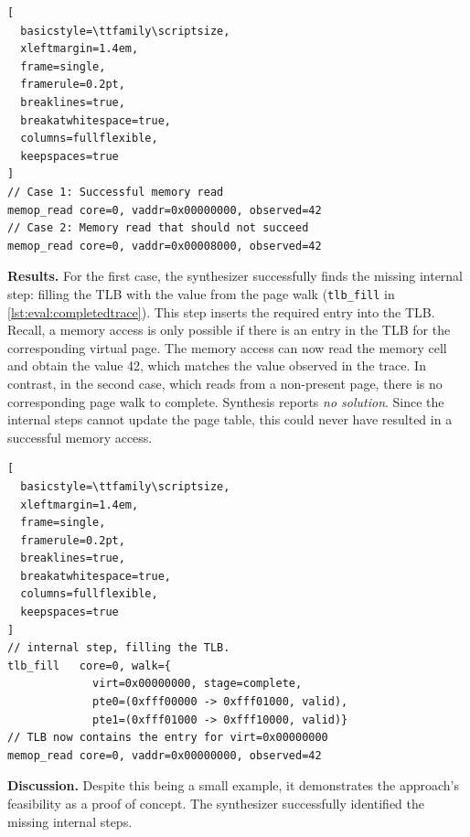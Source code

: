 \begin{lstfloat}[t]
\begin{lstlisting}[
  basicstyle=\ttfamily\scriptsize,
  xleftmargin=1.4em,
  frame=single,
  framerule=0.2pt,
  breaklines=true,
  breakatwhitespace=true,
  columns=fullflexible,
  keepspaces=true
]
// Case 1: Successful memory read
memop_read core=0, vaddr=0x00000000, observed=42
// Case 2: Memory read that should not succeed
memop_read core=0, vaddr=0x00008000, observed=42
\end{lstlisting}
\caption{Observable program Traces for the satisfiable and unsatisfiable evaluation cases.}
\label{lst:eval:traces}
\end{lstfloat}


\noindent\textbf{Results.}
%
For the first case, the synthesizer successfully finds the missing internal step: filling the TLB with the value from the page walk (\texttt{tlb\_fill} in \autoref{lst:eval:completedtrace}). This step inserts the required entry into the TLB. Recall, a memory access is only possible if there is an entry in the TLB for the corresponding virtual page. The memory access can now read the memory cell and obtain the value 42, which matches the value observed in the trace.
In contrast, in the second case, which reads from a non-present page, there is no corresponding page walk to complete. Synthesis reports \emph{no solution}. Since the internal steps cannot update the page table, this could never have resulted in a successful memory access. 

\begin{lstfloat}[t]
\begin{lstlisting}[
  basicstyle=\ttfamily\scriptsize,
  xleftmargin=1.4em,
  frame=single,
  framerule=0.2pt,
  breaklines=true,
  breakatwhitespace=true,
  columns=fullflexible,
  keepspaces=true
]
// internal step, filling the TLB.
tlb_fill   core=0, walk={
             virt=0x00000000, stage=complete,
             pte0=(0xfff00000 -> 0xfff01000, valid),
             pte1=(0xfff01000 -> 0xfff10000, valid)}
// TLB now contains the entry for virt=0x00000000
memop_read core=0, vaddr=0x00000000, observed=42
\end{lstlisting}
\caption{Completed Program Trace for Case 1.}
\label{lst:eval:completedtrace}
\end{lstfloat}

\noindent\textbf{Discussion.}
Despite this being a small example, it demonstrates the approach's feasibility as a proof of concept. The synthesizer successfully identified the missing internal steps.




